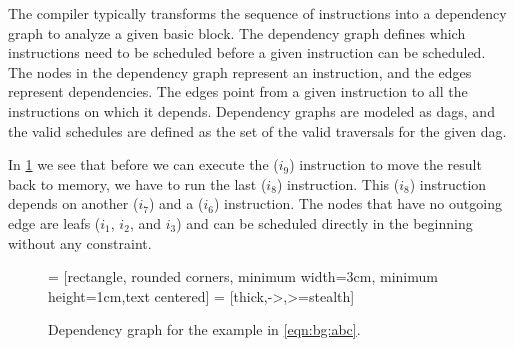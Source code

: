 The compiler typically transforms the sequence of instructions into a dependency graph to analyze a given basic block.
The dependency graph defines which instructions need to be scheduled before a given instruction can be scheduled.
The nodes in the dependency graph represent an instruction, and the edges represent dependencies.
The edges point from a given instruction to all the instructions on which it depends.
Dependency graphs are modeled as \acp{dag}, and the valid schedules are defined as the set of the valid traversals for the given \ac{dag}.

In \cref{fig:bg:example-dag} we see that before we can execute the  ($i_9$) instruction to move the result back to memory, we have to run the last  ($i_8$) instruction.
This  ($i_8$) instruction depends on another  ($i_7$) and a  ($i_6$) instruction.
The nodes that have no outgoing edge are leafs ($i_1$, $i_2$, and $i_3$) and can be scheduled directly in the beginning without any constraint.
\begin{figure}
    \centering

     = [rectangle, rounded corners, minimum width=3cm, minimum height=1cm,text centered]%
     = [thick,->,>=stealth]
    \caption[Dependency Graph]{Dependency graph for the example in \cref{eqn:bg:abc}.}
    \label{fig:bg:example-dag}
\end{figure}

